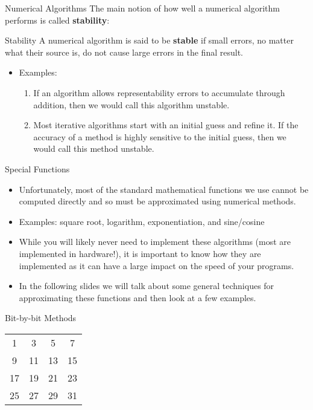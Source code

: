 \documentclass[serif,xcolor=pdftex,dvipsnames,table,hyperref={bookmarks=false,breaklinks}]{beamer}
\begin{document}
\begin{frame}[t]{Numerical Algorithms}
	The main notion of how well a numerical algorithm performs is called \textbf{stability}:
	
	\pause
	\begin{block}{Stability}
		A numerical algorithm is said to be \textbf{stable} if small errors, no matter what their source is, do not cause large errors in the final result.
	\end{block}
	
	\pause
	\begin{itemize}[<+->]
		\item Examples:
		\begin{enumerate}[<+->]
			\item If an algorithm allows representability errors to accumulate through addition, then we would call this algorithm unstable.
			\item Most iterative algorithms start with an initial guess and refine it. If the accuracy of a method is highly sensitive to the initial guess, then we would call this method unstable.
		\end{enumerate}
	\end{itemize}

\end{frame}
	
	

\begin{frame}[t]{Special Functions}
	\begin{itemize}[<+->]
		\item Unfortunately, most of the standard mathematical functions we use cannot be computed directly and so must be approximated using numerical methods.
		\item Examples: square root, logarithm, exponentiation, and sine/cosine
		\item While you will likely never need to implement these algorithms (most are implemented in hardware!), it is important to know how they are implemented as it can have a large impact on the speed of your programs.
		\item In the following slides we will talk about some general techniques for approximating these functions and then look at a few examples.
	\end{itemize}
\end{frame}

\begin{frame}[t]{Bit-by-bit Methods}
	\pause
	\Huge
	\vspace{1cm}
	\centering
	\begin{tabular}{c c c c}
		1 & 3 & 5 & 7\\
		9 & 11 & 13 & 15\\
		17 & 19 & 21 & 23\\
		25 & 27 & 29 & 31\\
	\end{tabular}
\end{frame}
\end{document}
